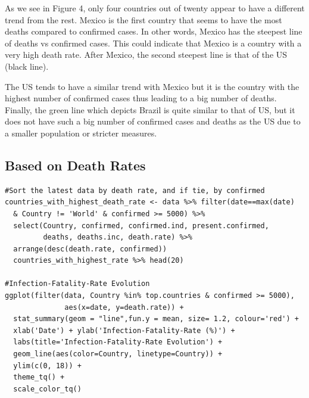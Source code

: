 As we see in Figure 4, only four countries out of twenty appear to have a different trend from the rest. Mexico is the first country that seems to have the most deaths compared to confirmed cases. In other words, Mexico has the steepest line of deaths vs confirmed cases. This could indicate that Mexico is a country with a very high death rate. After Mexico, the second steepest line is that of the US (black line).

The US tends to have a similar trend with Mexico but it is the country with the highest number of confirmed cases thus leading to a big number of deaths. Finally, the green line which depicts Brazil is quite similar to that of US, but it does not have such a big number of confirmed cases and deaths as the US due to a smaller population or stricter measures.

\newpage

\subsection{Based on Death Rates}

\begin{verbatim}
#Sort the latest data by death rate, and if tie, by confirmed
countries_with_highest_death_rate <- data %>% filter(date==max(date)
  & Country != 'World' & confirmed >= 5000) %>%
  select(Country, confirmed, confirmed.ind, present.confirmed,
         deaths, deaths.inc, death.rate) %>%
  arrange(desc(death.rate, confirmed))
  countries_with_highest_rate %>% head(20)
  
#Infection-Fatality-Rate Evolution
ggplot(filter(data, Country %in% top.countries & confirmed >= 5000), 
              aes(x=date, y=death.rate)) +
  stat_summary(geom = "line",fun.y = mean, size= 1.2, colour='red') +
  xlab('Date') + ylab('Infection-Fatality-Rate (%)') + 
  labs(title='Infection-Fatality-Rate Evolution') +
  geom_line(aes(color=Country, linetype=Country)) +
  ylim(c(0, 18)) + 
  theme_tq() + 
  scale_color_tq()
\end{verbatim}


